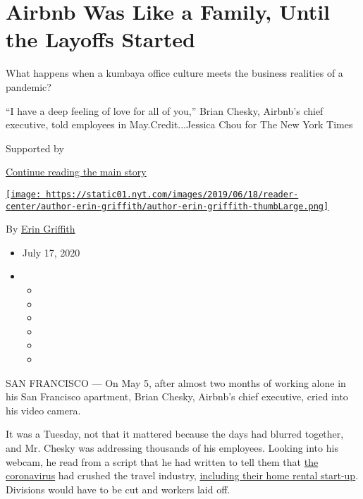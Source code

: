 \hypertarget{airbnb-was-like-a-family-until-the-layoffs-started}{%
\section{Airbnb Was Like a Family, Until the Layoffs
Started}\label{airbnb-was-like-a-family-until-the-layoffs-started}}

What happens when a kumbaya office culture meets the business realities
of a pandemic?

``I have a deep feeling of love for all of you,'' Brian Chesky, Airbnb's
chief executive, told employees in May.Credit...Jessica Chou for The New
York Times

Supported by

\protect\hyperlink{after-sponsor}{Continue reading the main story}

\href{https://www.nytimes.com/by/erin-griffith}{\texttt{[image: https://static01.nyt.com/images/2019/06/18/reader-center/author-erin-griffith/author-erin-griffith-thumbLarge.png]}}

By \href{https://www.nytimes.com/by/erin-griffith}{Erin Griffith}

\begin{itemize}
\item
  July 17, 2020
\item
  \begin{itemize}
  \item
  \item
  \item
  \item
  \item
  \item
  \end{itemize}
\end{itemize}

SAN FRANCISCO --- On May 5, after almost two months of working alone in
his San Francisco apartment, Brian Chesky, Airbnb's chief executive,
cried into his video camera.

It was a Tuesday, not that it mattered because the days had blurred
together, and Mr. Chesky was addressing thousands of his employees.
Looking into his webcam, he read from a script that he had written to
tell them that
\href{https://www.nytimes.com/news-event/coronavirus?action=click\&pgtype=Article\&state=default\&module=styln-coronavirus\&variant=show\&region=TOP_BANNER\&context=storylines_menu}{the
coronavirus} had crushed the travel industry,
\href{https://www.nytimes.com/2020/03/10/technology/airbnb-hosts-coronavirus.html}{including
their home rental start-up}. Divisions would have to be cut and workers
laid off.

